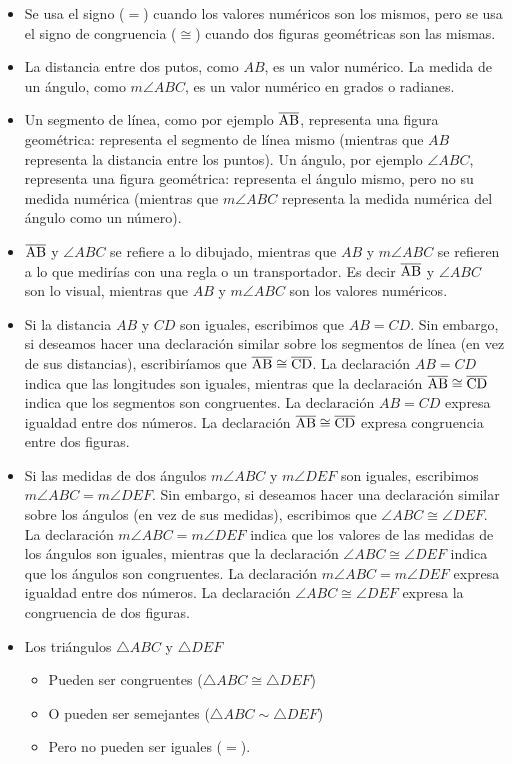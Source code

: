 \begin{itemize}
    \item Se usa el signo ($=$) cuando los valores numéricos son los mismos, pero se usa el signo de congruencia ($\cong$) cuando dos figuras geométricas son las mismas.   
    \item La distancia entre dos putos, como $AB$, es un valor numérico. La medida de un ángulo, como $m\angle{ABC}$, es un valor numérico en grados o radianes.
    \item Un segmento de línea, como por ejemplo $\overline{\rm AB}$, representa una figura geométrica: representa el segmento de línea mismo (mientras que $AB$ representa la distancia entre los puntos). Un ángulo, por ejemplo $\angle{ABC}$, representa una figura geométrica: representa el ángulo mismo, pero no su medida numérica (mientras que $m\angle{ABC}$ representa la medida numérica del ángulo como un número).
    \item $\overline{\rm AB}$ y $\angle{ABC}$ se refiere a lo dibujado, mientras que $AB$ y $m\angle{ABC}$ se refieren a lo que medirías con una regla o un transportador. Es decir $\overline{\rm AB}$ y $\angle{ABC}$ son lo visual, mientras que $AB$ y $m\angle{ABC}$ son los valores numéricos.
    \item Si la distancia $AB$ y $CD$ son iguales, escribimos que $AB = CD$. Sin embargo, si deseamos hacer una declaración similar sobre los segmentos de línea (en vez de sus distancias), escribiríamos que $\overline{\rm AB} \cong \overline{\rm CD}$. La declaración $AB = CD$ indica que las longitudes son iguales, mientras que la declaración $\overline{\rm AB} \cong \overline{\rm CD}$ indica que los segmentos son congruentes. La declaración $AB = CD$ expresa igualdad entre dos números. La declaración $\overline{\rm AB} \cong \overline{\rm CD}$ expresa congruencia entre dos figuras.
    \item Si las medidas de dos ángulos $m\angle{ABC}$ y $m\angle{DEF}$ son iguales, escribimos $m\angle{ABC} = m\angle{DEF}$. Sin embargo, si deseamos hacer una declaración similar sobre los ángulos (en vez de sus medidas), escribimos que $\angle{ABC} \cong \angle{DEF}$. La declaración $m\angle{ABC} = m\angle{DEF}$ indica que los valores de las medidas de los ángulos son iguales, mientras que la declaración $\angle{ABC} \cong \angle{DEF}$ indica que los ángulos son congruentes. La declaración $m\angle{ABC} = m\angle{DEF}$ expresa igualdad entre dos números. La declaración $\angle{ABC} \cong \angle{DEF}$ expresa la congruencia de dos figuras.
    \item Los triángulos $\triangle{ABC}$ y $\triangle{DEF}$
    \begin{itemize}
        \item Pueden ser congruentes ($\triangle{ABC} \cong \triangle{DEF}$) 
        \item O pueden ser semejantes ($\triangle{ABC} \sim \triangle{DEF}$)
        \item Pero no pueden ser iguales ($=$).
    \end{itemize}     
\end{itemize}

